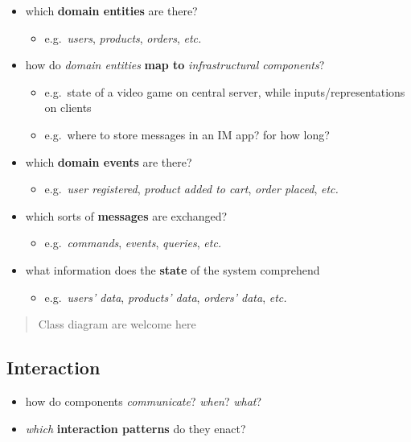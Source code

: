 \documentclass{scrartcl}
\begin{document}
\begin{itemize}
	\item which \textbf{domain entities} are there?
	\begin{itemize}
		\item e.g.~\emph{users}, \emph{products}, \emph{orders}, \emph{etc.}
	\end{itemize}
	
	\item how do \emph{domain entities} \textbf{map to} \emph{infrastructural components}?
	\begin{itemize}
		\item e.g.~state of a video game on central server, while inputs/representations on clients
		\item e.g.~where to store messages in an IM app? for how long?
	\end{itemize}
	
	\item which \textbf{domain events} are there?
	\begin{itemize}
		\item e.g.~\emph{user registered}, \emph{product added to cart}, \emph{order placed}, \emph{etc.}
	\end{itemize}
	
	\item which sorts of \textbf{messages} are exchanged?
	\begin{itemize}
		\item e.g.~\emph{commands}, \emph{events}, \emph{queries}, \emph{etc.}
	\end{itemize}
	
	\item what information does the \textbf{state} of the system comprehend
	\begin{itemize}
		\item e.g.~\emph{users' data}, \emph{products' data}, \emph{orders' data}, \emph{etc.}
	\end{itemize}
\end{itemize}

\begin{quote}
	Class diagram are welcome here
\end{quote}

\subsection{Interaction}\label{interaction}

\begin{itemize}
	\item how do components \emph{communicate}? \emph{when}? \emph{what}?
	\item \emph{which} \textbf{interaction patterns} do they enact?
\end{itemize}
\end{document}
